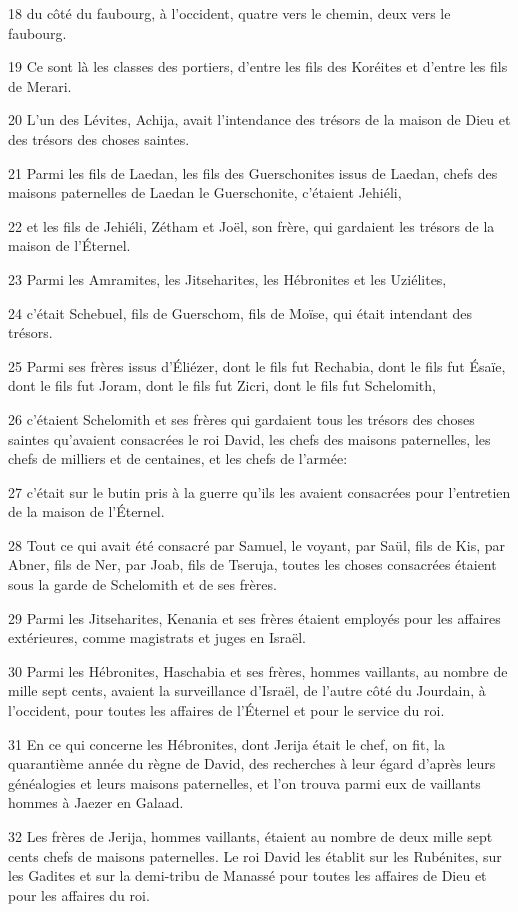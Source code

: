 \par 18 du côté du faubourg, à l'occident, quatre vers le chemin, deux vers le faubourg.
\par 19 Ce sont là les classes des portiers, d'entre les fils des Koréites et d'entre les fils de Merari.
\par 20 L'un des Lévites, Achija, avait l'intendance des trésors de la maison de Dieu et des trésors des choses saintes.
\par 21 Parmi les fils de Laedan, les fils des Guerschonites issus de Laedan, chefs des maisons paternelles de Laedan le Guerschonite, c'étaient Jehiéli,
\par 22 et les fils de Jehiéli, Zétham et Joël, son frère, qui gardaient les trésors de la maison de l'Éternel.
\par 23 Parmi les Amramites, les Jitseharites, les Hébronites et les Uziélites,
\par 24 c'était Schebuel, fils de Guerschom, fils de Moïse, qui était intendant des trésors.
\par 25 Parmi ses frères issus d'Éliézer, dont le fils fut Rechabia, dont le fils fut Ésaïe, dont le fils fut Joram, dont le fils fut Zicri, dont le fils fut Schelomith,
\par 26 c'étaient Schelomith et ses frères qui gardaient tous les trésors des choses saintes qu'avaient consacrées le roi David, les chefs des maisons paternelles, les chefs de milliers et de centaines, et les chefs de l'armée:
\par 27 c'était sur le butin pris à la guerre qu'ils les avaient consacrées pour l'entretien de la maison de l'Éternel.
\par 28 Tout ce qui avait été consacré par Samuel, le voyant, par Saül, fils de Kis, par Abner, fils de Ner, par Joab, fils de Tseruja, toutes les choses consacrées étaient sous la garde de Schelomith et de ses frères.
\par 29 Parmi les Jitseharites, Kenania et ses frères étaient employés pour les affaires extérieures, comme magistrats et juges en Israël.
\par 30 Parmi les Hébronites, Haschabia et ses frères, hommes vaillants, au nombre de mille sept cents, avaient la surveillance d'Israël, de l'autre côté du Jourdain, à l'occident, pour toutes les affaires de l'Éternel et pour le service du roi.
\par 31 En ce qui concerne les Hébronites, dont Jerija était le chef, on fit, la quarantième année du règne de David, des recherches à leur égard d'après leurs généalogies et leurs maisons paternelles, et l'on trouva parmi eux de vaillants hommes à Jaezer en Galaad.
\par 32 Les frères de Jerija, hommes vaillants, étaient au nombre de deux mille sept cents chefs de maisons paternelles. Le roi David les établit sur les Rubénites, sur les Gadites et sur la demi-tribu de Manassé pour toutes les affaires de Dieu et pour les affaires du roi.

